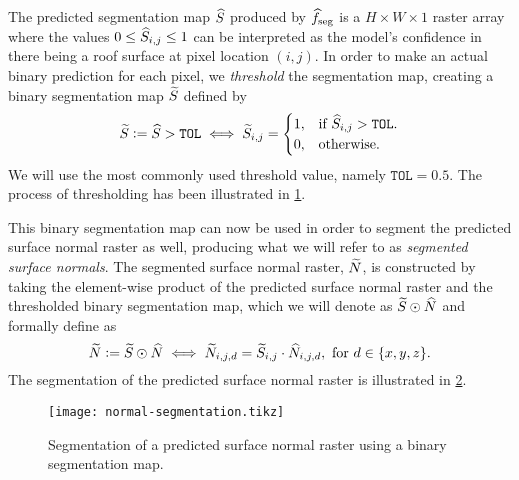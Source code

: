 The predicted segmentation map $\widehat{S}$ produced by $\widehat{f}_{\mathrm{seg}}$ is a $H \times W \times 1$ raster array where the values $0 \leq \widehat{S}_{i,j} \leq 1$ can be interpreted as the model's confidence in there being a roof surface at pixel location $(i, j)$.
In order to make an actual binary prediction for each pixel, we \textit{threshold} the segmentation map, creating a binary segmentation map $\widetilde{S}$ defined by
\begin{equation*}
  \widetilde{S} \vcentcolon= \widehat{S} > \texttt{TOL}
  \iff
  \widetilde{S}_{i, j}
  =
  \begin{cases}
    1, &\text{if } \widehat{S}_{i, j} > \texttt{TOL}. \\
    0, &\text{otherwise.}
  \end{cases}
\end{equation*}
We will use the most commonly used threshold value, namely $\texttt{TOL} = 0.5$.
The process of thresholding has been illustrated in \cref{fig:activation-thresholding}.
\begin{figure}[H]
  \centering
  \label{fig:activation-thresholding}
\end{figure}
\noindent
This binary segmentation map can now be used in order to segment the predicted surface normal raster as well, producing what we will refer to as \textit{segmented surface normals}.
The segmented surface normal raster, $\widetilde{N}$, is constructed by taking the element-wise product of the predicted surface normal raster and the thresholded binary segmentation map, which we will denote as $\widetilde{S} \odot \widehat{N}$ and formally define as
\begin{equation*}
  \widetilde{N} \vcentcolon= \widetilde{S} \odot \widehat{N}
  \iff
  \widetilde{N}_{i, j, d}
  =
    \widetilde{S}_{i, j}
    \cdot
    \widehat{N}_{i, j, d},
  \text{ for } d \in \{x, y, z\}.
\end{equation*}
The segmentation of the predicted surface normal raster is illustrated in \cref{fig:normal-segmentation}.
\begin{figure}[H]
  \centering
  \texttt{[image: normal-segmentation.tikz]}
  \caption{Segmentation of a predicted surface normal raster using a binary segmentation map.}%
  \label{fig:normal-segmentation}
\end{figure}
